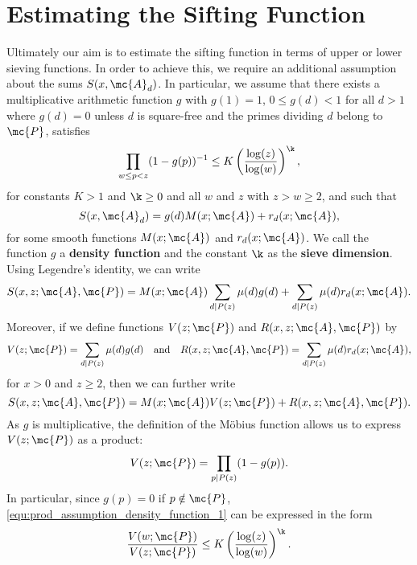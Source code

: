   \section{Estimating the Sifting Function}
    Ultimately our aim is to estimate the sifting function in terms of upper or lower sieving functions. In order to achieve this, we require an additional assumption about the sums $S(x,\mc{A}_{d})$. In particular, we assume that there exists a multiplicative arithmetic function $g$ with $g(1) = 1$, $0 \le g(d) < 1$ for all $d > 1$ where $g(d) = 0$ unless $d$ is square-free and the primes dividing $d$ belong to $\mc{P}$, satisfies
    \begin{equation}\label{equ:prod_assumption_density_function_1}
      \prod_{w \le p < z}(1-g(p))^{-1} \le K\left(\frac{\log(z)}{\log(w)}\right)^{\k},
    \end{equation}
    for constants $K > 1$ and $\k \ge 0$ and all $w$ and $z$ with $z > w \ge 2$, and such that  
    \begin{equation}\label{equ:d_multiple_sifting_function}
      S(x,\mc{A}_{d}) = g(d)M(x;\mc{A})+r_{d}(x;\mc{A}),
    \end{equation}
    for some smooth functions $M(x;\mc{A})$ and $r_{d}(x;\mc{A})$. We call the function $g$ a \textbf{density function} and the constant $\k$ as the \textbf{sieve dimension}. Using Legendre's identity, we can write
    \[
      S(x,z;\mc{A},\mc{P}) = M(x;\mc{A})\sum_{d \mid P(z)}\mu(d)g(d)+\sum_{d \mid P(z)}\mu(d)r_{d}(x;\mc{A}).
    \]
    Moreover, if we define functions $V(z;\mc{P})$ and $R(x,z;\mc{A},\mc{P})$ by
    \[
      V(z;\mc{P}) = \sum_{d \mid P(z)}\mu(d)g(d) \quad \text{and} \quad R(x,z;\mc{A},\mc{P}) = \sum_{d \mid P(z)}\mu(d)r_{d}(x;\mc{A}),
    \]
    for $x > 0$ and $z \ge 2$, then we can further write
    \[
      S(x,z;\mc{A},\mc{P}) = M(x;\mc{A})V(z;\mc{P})+R(x,z;\mc{A},\mc{P}).
    \]
    As $g$ is multiplicative, the definition of the M\"obius function allows us to express $V(z;\mc{P})$ as a product:
    \begin{equation}\label{equ:V_product_formula}
      V(z;\mc{P}) = \prod_{p \mid P(z)}(1-g(p)).
    \end{equation}
    In particular, since $g(p) = 0$ if $p \notin \mc{P}$, \cref{equ:prod_assumption_density_function_1} can be expressed in the form
    \begin{equation}\label{equ:prod_assumption_density_function_2}
      \frac{V(w;\mc{P})}{V(z;\mc{P})} \le K\left(\frac{\log(z)}{\log(w)}\right)^{\k}.
    \end{equation}
